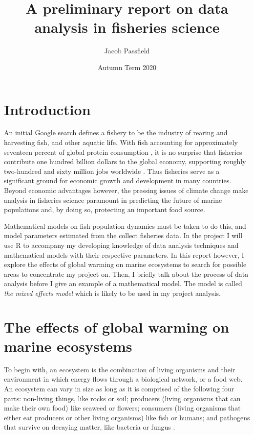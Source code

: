 \documentclass{article}
\title{\huge{\bf{A preliminary report on data analysis in fisheries science}}}
\author{Jacob Passfield}
\date{Autumn Term 2020}
\begin{document}
\maketitle

\section{Introduction}

An initial Google search defines a fishery to be the industry of rearing and harvesting fish, and other aquatic life. With fish accounting for approximately seventeen percent of global protein consumption \cite{1}, it is no surprise that fisheries contribute one hundred billion dollars to the global economy, supporting roughly two-hundred and sixty million jobs worldwide \cite{2}. Thus fisheries serve as a significant ground for economic growth and development in many countries. Beyond economic advantages however, the pressing issues of climate change make analysis in fisheries science paramount in predicting the future of marine populations and, by doing so, protecting an important food source. 

Mathematical models on fish population dynamics must be taken to do this, and  model parameters estimated from the collect fisheries data. In the project I will use R to accompany my developing knowledge of data analysis techniques and mathematical models with their respective parameters. In this report however, I explore the effects of global warming on marine ecosystems to search for possible areas to concentrate my project on. Then, I briefly talk about the process of data analysis before I give an example of a mathematical model. The model is called \textit{the mixed effects model} which is likely to be used in my project analysis.

\section{The effects of global warming on marine ecosystems}

To begin with, an ecosystem is the combination of living organisms and their environment in which energy flows through a biological network, or a food web. An ecosystem can vary in size as long as it is comprised of the following four parts: non-living things, like rocks or soil; producers (living organisms that can make their own food) like seaweed or flowers; consumers (living organisms that either eat producers or other living organisms) like fish or humans; and pathogens that survive on decaying matter, like bacteria or fungus \cite{3}. 
\end{document}
